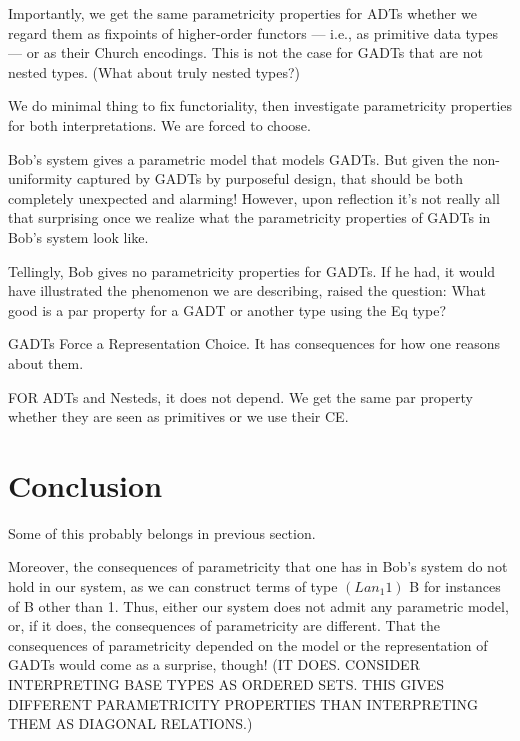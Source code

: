 \documentclass[acmsmall,screen,review,anonymous]{acmart}
\theoremstyle{definition}
\begin{document}
Importantly, we get the same parametricity properties for ADTs whether
we regard them as fixpoints of higher-order functors --- i.e., as
primitive data types --- or as their Church encodings. This is not the
case for GADTs that are not nested types. (What about truly nested
types?)

We do minimal thing to fix functoriality, then investigate
parametricity properties for both interpretations. We are forced to
choose. 

Bob's system gives a parametric model that models GADTs. But given the
non-uniformity captured by GADTs by purposeful design, that should be
both completely unexpected and alarming! However, upon reflection it's
not really all that surprising once we realize what the parametricity
properties of GADTs in Bob's system look like.


Tellingly, Bob gives no parametricity properties for GADTs. If he had,
it would have illustrated the phenomenon we are describing, raised the
question: What good is a par property for a GADT or another type using
the Eq type?

GADTs Force a Representation Choice. It has consequences for how one
reasons about them.

FOR ADTs and Nesteds, it does not depend. We get the same par property
whether they are seen as primitives or we use their CE.

\section{Conclusion}

{\color{blue} Some of this probably belongs in previous section.}

Moreover, the consequences of parametricity that one has in Bob's
system do not hold in our system, as we can construct terms of type
$(Lan_1 1)$ B for instances of B other than 1.  Thus, either our
system does not admit any parametric model, or, if it does, the
consequences of parametricity are different.  That the consequences of
parametricity depended on the model or the representation of GADTs
would come as a surprise, though!  (IT DOES. CONSIDER INTERPRETING
BASE TYPES AS ORDERED SETS. THIS GIVES DIFFERENT PARAMETRICITY
PROPERTIES THAN INTERPRETING THEM AS DIAGONAL RELATIONS.)
\end{document}
